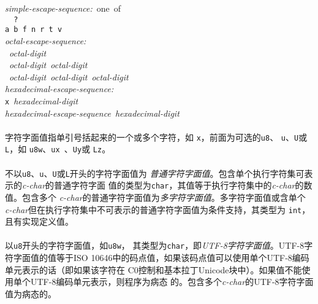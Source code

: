 \noindent \mbox{\qquad \textit{simple-escape-sequence:} one of}               \\
\mbox{\qquad \qquad \texttt{\bslh\qsgl\ \bslh\qdbl\ \bslh?\ \bslh\bslh}}      \\
\mbox{\qquad \qquad \texttt{\bslh a \bslh b \bslh f \bslh n \bslh r \bslh t
  \bslh v}}                                                                   \\
\noindent \mbox{\qquad \textit{octal-escape-sequence:}}                       \\
\mbox{\qquad \qquad \texttt{\bslh} \textit{octal-digit}}                      \\
\mbox{\qquad \qquad \texttt{\bslh} \textit{octal-digit octal-digit}}          \\
\mbox{\qquad \qquad \texttt{\bslh} \textit{octal-digit octal-digit
  octal-digit}}                                                               \\
\noindent \mbox{\qquad \textit{hexadecimal-escape-sequence:}}                 \\
\mbox{\qquad \qquad \texttt{\bslh x} \textit{hexadecimal-digit}}              \\
\mbox{\qquad \qquad \textit{hexadecimal-escape-sequence}
  \textit{hexadecimal-digit}}                                                 \\

\paragraph{}
字符字面值指单引号括起来的一个或多个字符，如
\texttt{\qsgl x\qsgl}，前面为可选的\texttt{u8}、
\texttt{u}、\texttt{U}或\texttt{L}，如
\texttt{u8\qsgl w\qsgl}、\texttt{u\qsgl x\
\qsgl}、\texttt{U\qsgl y\qsgl}或
\texttt{L\qsgl z\qsgl}。

\paragraph{}
不以\texttt{u8}、\texttt{u}、\texttt{U}或\texttt{L}开头的字符字面值为
\textit{普通字符字面值}。包含单个执行字符集可表示的\textit{c-char}的普通字符字面
值的类型为\texttt{char}，其值等于执行字符集中的\textit{c-char}的数值。包含多个
\textit{c-char}的普通字符字面值为\textit{多字符字面值}。多字符字面值或含单个
\textit{c-char}但在执行字符集中不可表示的普通字符字面值为条件支持，其类型为
\texttt{int}，且有实现定义值。

\paragraph{}
以\texttt{u8}开头的字符字面值，如\texttt{u8\qsgl{}w\qsgl}，
其类型为\texttt{char}，即\textit{UTF-8字符字面值}。UTF-8字符字面值的值等于ISO
10646中的码点值，如果该码点值可以使用单个UTF-8编码单元表示的话（即如果该字符在
C0控制和基本拉丁Unicode块中）。如果值不能使用单个UTF-8编码单元表示，则程序为病态
的。包含多个\textit{c-char}的UTF-8字符字面值为病态的。


